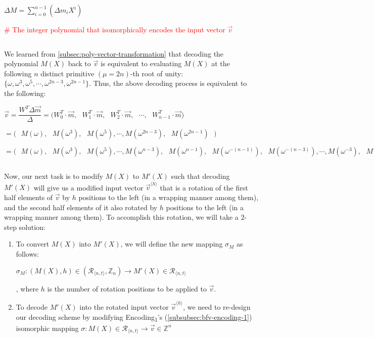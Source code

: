 $\Delta M = \sum\limits_{i=0}^{n-1} ( \Delta m_i  X^i)$ 

\textcolor{red}{\# The integer polynomial that isomorphically encodes the input vector $\vec{v}$}


$ $

We learned from \autoref{subsec:poly-vector-transformation} that decoding the polynomial $M(X)$ back to $\vec{v}$ is equivalent to evaluating $M(X)$ at the following $n$ distinct primitive $(\mu=2n)$-th root of unity: $\{\omega, \omega^3, \omega^5, \cdots, \omega^{2n-3}, \omega^{2n-1} \}$. Thus, the above decoding process is equivalent to the following:

$\vec{v} = \dfrac{W^T \Delta \vec{m}}{\Delta} = \bm{(}W^T_0\cdot \vec{m}, \text{ } W^T_1\cdot \vec{m}, \text{ } W^T_2\cdot \vec{m}, \text{ } \cdots, \text{ } W^T_{n-1}\cdot \vec{m}\bm{)}$  

$= \bm{(} \text{ } M(\omega), \text{ } M(\omega^3), \text{ } M(\omega^5), \cdots, M(\omega^{2n-3}), \text{ } M(\omega^{2n-1}) \text{ } \bm{)}$


$= \bm{(} \text{ } M(\omega), \text{ } M(\omega^3), \text{ } M(\omega^5), \cdots, M(\omega^{n-3}), \text{ } M(\omega^{n-1}), \text{ } M(\omega^{-(n-1)}), \text{ } M(\omega^{-(n-3)}), \cdots, M(\omega^{-3}), \text{ } M(\omega{-1}) \text{ } \bm{)}$ 





$ $

Now, our next task is to modify $M(X)$ to $M'(X)$ such that decoding $M'(X)$ will give us a modified input vector $\vec{v}^{\langle h \rangle}$ that is a rotation of the first half elements of $\vec{v}$ by $h$ positions to the left (in a wrapping manner among them), and the second half elements of it also rotated by $h$ positions to the left (in a wrapping manner among them). To accomplish this rotation, we will take a 2-step solution: 

\begin{enumerate}[leftmargin=3\parindent]
\item To convert $M(X)$ into $M'(X)$, we will define the new mapping $\sigma_M$ as follows: 

$\sigma_M : (M(X), h) \in (\mathcal{R}_{\langle n, t \rangle}, \mathbb{Z}_{n}) \longrightarrow M'(X) \in \mathcal{R}_{\langle n, t \rangle}$

, where $h$ is the number of rotation positions to be applied to $\vec{v}$.
\item To decode $M'(X)$ into the rotated input vector $\vec{v}^{\langle h \rangle}$, we need to re-design our decoding scheme by modifying \textsf{Encoding\textsubscript{1}}'s (\autoref{subsubsec:bfv-encoding-1}) isomorphic mapping $\sigma : M(X) \in \mathcal{R}_{\langle n, t \rangle} \longrightarrow \vec{v} \in \mathbb{Z}^n$ 
\end{enumerate}

